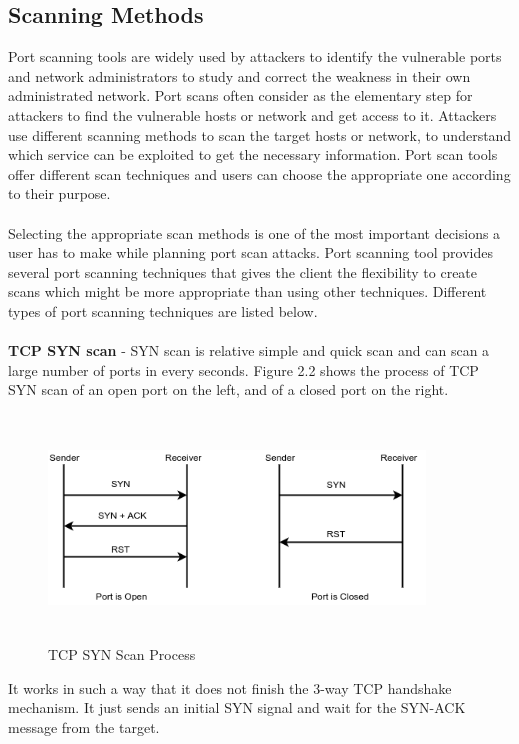     \subsection{Scanning Methods}
    Port scanning tools are widely used by attackers to identify the vulnerable ports and network administrators to study and correct the weakness in their own administrated network.
    Port scans often consider as the elementary step for attackers to find the vulnerable hosts or network and get access to it.
    Attackers use different scanning methods to scan the target hosts or network, to understand which service can be exploited to get the necessary information. 
    Port scan tools offer different scan techniques and users can choose the appropriate one according to their purpose.\\\\
    Selecting the appropriate scan methods is one of the most important decisions a user has to make while planning port scan attacks.
    Port scanning tool provides several port scanning techniques that gives the client the flexibility to create scans which might be more appropriate than using other techniques.
    Different types of port scanning techniques are listed below.\\\\
    \textbf{TCP SYN scan} -  SYN scan is relative simple and quick scan and can scan a large number of ports in every  seconds. 
    Figure 2.2 shows the process of TCP SYN scan  of an open port on the left, and of a closed port on the right.
    \begin{figure}[t]
    \centering
	\includegraphics[width=10cm, height=6cm]{images/tcp_synscan.png}
	\caption{TCP SYN Scan Process}
	\end{figure}
    It  works  in  such  a  way  that  it  does not  finish  the  3-way  TCP  handshake mechanism.  
    It  just  sends  an  initial  SYN  signal  and  wait  for  the  SYN-ACK  message from  the  target.
